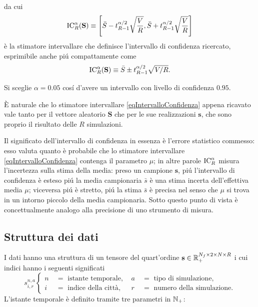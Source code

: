       da cui
      \begin{equation*}
        \operatorname{IC}^\alpha_R(\mathbf S)\equiv\left[
          \bar S-t_{R-1}^{\alpha/2}\sqrt{\frac VR},
          \bar S+t_{R-1}^{\alpha/2}\sqrt{\frac VR}
        \right]
      \end{equation*}
      è la stimatore intervallare che definisce l'intervallo di confidenza ricercato, esprimibile anche piú compattamente come
      \begin{equation}
        \label{eqIntervalloConfidenza}
        \operatorname{IC}^\alpha_R(\mathbf S)\equiv\bar S\pm t_{R-1}^{\alpha/2}\sqrt{V/R}.
      \end{equation}
      \begin{ipo}
        Si sceglie \(\alpha=0.05\) cosí d'avere un intervallo con livello di confidenza \(0.95\).  
      \end{ipo}
      \begin{oss}
        È naturale che lo stimatore intervallare \cref{eqIntervalloConfidenza} appena ricavato vale tanto per il vettore aleatorio \(\mathbf S\) che per le sue realizzazioni\footnotemark{} \(\mathbf s\), che sono proprio il risultato delle \(R\) simulazioni.
      \end{oss}%
      Il significato dell'intervallo di confidenza in essenza è l'errore statistico commesso: esso valuta quanto è probabile che lo stimatore intervallare \cref{eqIntervalloConfidenza} contenga il parametro \(\mu\); in altre parole \(\operatorname{IC}^\alpha_R\) misura l'incertezza sulla stima della media: preso un campione \(\mathbf s\), piú l'intervallo di confidenza è esteso piú la media campionaria \(\bar s\) è una stima incerta dell'effettiva media \(\mu\); viceversa piú è stretto, piú la stima \(\bar s\) è precisa nel senso che \(\mu\) si trova in un intorno piccolo della media campionaria. Sotto questo punto di vista è concettualmente analogo alla precisione di uno strumento di misura.

    \subsection{Struttura dei dati}

      I dati hanno una struttura di un tensore del quart'ordine \(\mathbf s\in\mathbb R_+^{N_f\times2\times N\times R}\) i cui indici hanno i seguenti significati
      \begin{equation*}
        s^{n,a}_{i,r}
        \left\{\begin{aligned}
          n\ &=\text{ istante temporale},&\ 
          a\ &=\text{ tipo di simulazione},\\
          i\ &=\text{ indice della città},&\ 
          r\ &=\text{ numero della simulazione}.
        \end{aligned}\right.
      \end{equation*}
      L'istante temporale è definito tramite tre parametri in \(\mathbb N_+\):


